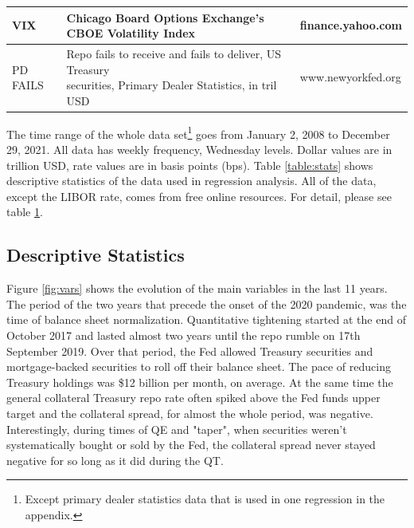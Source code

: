 \documentclass[11pt,a4paper,english,oneside]{article}
\begin{document}
\begin{table}
{\begin{tabular}{lll}
\hline
  VIX & Chicago Board Options Exchange's CBOE Volatility Index & finance.yahoo.com\\
\hline
  PD FAILS & \makecell[l]{Repo fails to receive and fails to deliver, US Treasury\\securities, Primary Dealer Statistics, in tril USD} & www.newyorkfed.org \\
  \bottomrule
\end{tabular}}
\label{table:variables}
\end{table}

The time range of the whole data set\footnote{Except primary dealer statistics data that is used in one regression in the appendix.} goes from January 2, 2008 to December 29, 2021. All data has weekly frequency, Wednesday levels. Dollar values are in trillion USD, rate values are in basis points (bps). Table \ref{table:stats} shows descriptive statistics of the data used in regression analysis. All of the data, except the LIBOR rate, comes from free online resources. For detail, please see table \ref{table:variables}.


\subsection{Descriptive Statistics} \label{sec:stats}

Figure \ref{fig:vars} shows the evolution of the main variables in the last 11 years. The period of the two years that precede the onset of the 2020 pandemic, was the time of balance sheet normalization. Quantitative tightening started at the end of October 2017 and lasted almost two years until the repo rumble on 17th September 2019. Over that period, the Fed allowed Treasury securities and mortgage-backed securities to roll off their balance sheet. The pace of reducing Treasury holdings was \$12 billion per month, on average. At the same time the general collateral Treasury repo rate often spiked above the Fed funds upper target and the collateral spread, for almost the whole period, was negative. Interestingly, during times of QE and "taper", when securities weren't systematically bought or sold by the Fed, the collateral spread never stayed negative for so long as it did during the QT.
\end{document}
